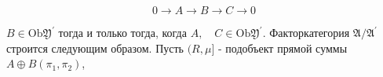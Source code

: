 \documentclass[10pt]{article}
\begin{document}
\[

0 \rightarrow A \rightarrow B \rightarrow C \rightarrow 0

\]



$B \in \mathrm{Ob} \mathfrak{Y}^{\prime}$ тогда и только тогда, когда $A, \quad C \in \mathrm{Ob} \mathfrak{Y}^{\prime}$. Факторкатегория $\mathfrak{A} / \mathfrak{A}^{\prime}$ строится следующим образом. Пусть $(R, \mu]$ - подобъект прямой суммы $A \oplus B\left(\pi_{1}, \pi_{2}\right)$,
\end{document}
